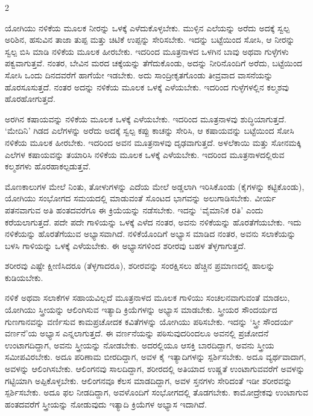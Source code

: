 \begin{multicols}{2}
\begin{kan}

ಯೋಗಿಯು ನಳಿಕೆಯ ಮೂಲಕ ನೀರನ್ನು ಒಳಕ್ಕೆ ಎಳೆದುಕೊಳ್ಳಬೇಕು. ಮುಳ್ಳಿನ ಎಲೆಯನ್ನು ಅರೆದು ಅದಕ್ಕೆ ಸ್ವಲ್ಪ ಅರಿಶಿನ, ಹಸುವಿನ ತಾಜಾ ತುಪ್ಪ ಮತ್ತು ಚಿಟಿಕೆ ಉಪ್ಪನ್ನು ಸೇರಿಸಬೇಕು. ಇದನ್ನು ಬಟ್ಟೆಯಿಂದ ಸೋಸಿ, ಆ ನೀರನ್ನು ಸ್ವಲ್ಪ ಬಿಸಿ ಮಾಡಿ ನಳಿಕೆಯ ಮೂಲಕ ಹೀರಬೇಕು. ಇದರಿಂದ ಮೂತ್ರನಾಳದ ಒಳಗಿನ ಬಾವು ಅಥವಾ ಗುಳ್ಳೆಗಳು ಪಕ್ವವಾಗುತ್ತವೆ. ನಂತರ, ಬೇವಿನ ಮರದ ಚಕ್ಕೆಯನ್ನು ತೆಗೆದುಕೊಂಡು, ಅದನ್ನು ನೀರಿನೊಂದಿಗೆ ಅರೆದು, ಬಟ್ಟೆಯಿಂದ ಸೋಸಿ ಒಂದು ದಿನದವರೆಗೆ ಹಾಗೆಯೇ ಇಡಬೇಕು. ಅದು ಸಾಂದ್ರೀಕೃತಗೊಂಡು ತೀವ್ರವಾದ ವಾಸನೆಯನ್ನು ಹೊರಸೂಸುತ್ತದೆ. ನಂತರ ಅದನ್ನು ನಳಿಕೆಯ ಮೂಲಕ ಒಳಕ್ಕೆ ಎಳೆಯಬೇಕು. ಇದರಿಂದ ಗುಳ್ಳೆಗಳಲ್ಲಿನ ಕಲ್ಮಶವು ಹೊರಹೋಗುತ್ತದೆ.

ಅರಗಿನ ಕಷಾಯವನ್ನು ನಳಿಕೆಯ ಮೂಲಕ ಒಳಕ್ಕೆ ಎಳೆಯಬೇಕು. ಇದರಿಂದ ಮೂತ್ರನಾಳವು ಶುದ್ಧಿಯಾಗುತ್ತದೆ. ‘ಮೇದಿನಿ’ ಗಿಡದ ಎಲೆಗಳನ್ನು ಅರೆದು ಅದಕ್ಕೆ ಸ್ವಲ್ಪ ಕಪ್ಪು ಕಾಚನ್ನು ಸೇರಿಸಿ, ಆ ಕಷಾಯವನ್ನು ಬಟ್ಟೆಯಿಂದ ಸೋಸಿ ನಳಿಕೆಯ ಮೂಲಕ ಹೀರಬೇಕು. ಇದರಿಂದ ಅವನ ಮೂತ್ರನಾಳವು ದೃಢವಾಗುತ್ತದೆ. ಅಳಲೆಕಾಯಿ ಮತ್ತು ಸೋನಮಕ್ಕಿ ಎಲೆಗಳ ಕಷಾಯವನ್ನು ತಯಾರಿಸಿ ನಳಿಕೆಯ ಮೂಲಕ ಒಳಕ್ಕೆ ಎಳೆಯಬೇಕು. ಇದರಿಂದ ಮೂತ್ರನಾಳದಲ್ಲಿರುವ ಕಲ್ಮಶಗಳು ಹೊರಹಾಕಲ್ಪಡುತ್ತವೆ.
\vskip 7pt


ಮೊಣಕಾಲುಗಳ ಮೇಲೆ ನಿಂತು, ತೋಳುಗಳನ್ನು ಎದೆಯ ಮೇಲೆ ಅಡ್ಡಲಾಗಿ ಇರಿಸಿಕೊಂಡು (ಕೈಗಳನ್ನು ಕಟ್ಟಿಕೊಂಡು), ಯೋಗಿಯು ಸಂಭೋಗದ ಸಮಯದಲ್ಲಿ ಮಾಡುವಂತೆ ಸೊಂಟದ ಭಾಗವನ್ನು ಅಲುಗಾಡಿಸಬೇಕು. ವೀರ್ಯ ಪತನವಾಗುವ ಅತಿ ಹಂತದವರೆಗೂ ಈ ಕ್ರಿಯೆಯನ್ನು ನಡೆಸಬೇಕು. ಇದನ್ನು ‘ವೈಮಾನಿಕ ರತಿ’ ಎಂದು ಕರೆಯಲಾಗುತ್ತದೆ. ಪದೇ ಪದೇ ಗಾಳಿಯನ್ನು ಒಳಕ್ಕೆ ಎಳೆದ ನಂತರ, ಅವನು ನಳಿಕೆಯನ್ನು ಹೊರತೆಗೆಯಬೇಕು. ಇದು ನಳಿಕೆಯನ್ನು ಹೊರತೆಗೆಯುವ ಅಭ್ಯಾಸವಾಗಿದೆ. ನಳಿಕೆಯೊಂದಿಗೆ ಅಭ್ಯಾಸ ಮಾಡಿದ ನಂತರ, ಅವನು ಸಲಾಕೆಯನ್ನು ಬಳಸಿ ಗಾಳಿಯನ್ನು ಒಳಕ್ಕೆ ಎಳೆಯಬೇಕು. ಈ ಅಭ್ಯಾಸಗಳಿಂದ ಶರೀರವು ಬಹಳ ತೆಳ್ಳಗಾಗುತ್ತದೆ.

ಶರೀರವು ಎಷ್ಟೇ ಕ್ಷೀಣಿಸಿದರೂ (ತೆಳ್ಳಗಾದರೂ), ಶರೀರವನ್ನು ಸಂರಕ್ಷಿಸಲು ಹೆಚ್ಚಿನ ಪ್ರಮಾಣದಲ್ಲಿ ಹಾಲನ್ನು ಕುಡಿಯಬೇಕು.
\vskip 7pt


ನಳಿಕೆ ಅಥವಾ ಸಲಾಕೆಗಳ ಸಹಾಯವಿಲ್ಲದೆ ಮೂತ್ರನಾಳದ ಮೂಲಕ ಗಾಳಿಯು ಸಂಚಲನವಾಗುವಂತೆ ಮಾಡಲು, ಯೋಗಿಯು ಸ್ತ್ರೀಯನ್ನು ಆಲಿಂಗಿಸುವ ಇತ್ಯಾದಿ ಕ್ರಿಯೆಗಳನ್ನು ಅಭ್ಯಾಸ ಮಾಡಬೇಕು. ಸ್ತ್ರೀಯರ ಸೌಂದರ್ಯದ ಗುಣಗಾನವನ್ನು ವರ್ಣಿಸುವ ಕಾಮಪ್ರಚೋದಕ ಕವಿತೆಗಳನ್ನು ಯೋಗಿಯು ಪಠಿಸಬೇಕು. ಇದನ್ನು ‘ಸ್ತ್ರೀ ಸೌಂದರ್ಯ ವರ್ಣನೆ’ಯ ಅಭ್ಯಾಸ ಎನ್ನಲಾಗುತ್ತದೆ. ಈ ವರ್ಣನೆಯನ್ನು ಪಠಿಸುವುದರಿಂದಲೂ ಅವನಲ್ಲಿ ಪ್ರಚೋದನೆ ಉಂಟಾಗದಿದ್ದಾಗ, ಅವನು ಸ್ತ್ರೀಯನ್ನು ನೋಡಬೇಕು. ಅದರಲ್ಲಿಯೂ ಆಸಕ್ತಿ ಬಾರದಿದ್ದಾಗ, ಅವನು ಸ್ತ್ರೀಯ ಸಮೀಪವಿರಬೇಕು. ಅದೂ ಪರಿಣಾಮ ಬೀರದಿದ್ದಾಗ, ಅವಳ ಕೈ ಇತ್ಯಾದಿಗಳನ್ನು ಸ್ಪರ್ಶಿಸಬೇಕು. ಅದೂ ವ್ಯರ್ಥವಾದಾಗ, ಅವಳನ್ನು ಆಲಿಂಗಿಸಬೇಕು. ಆಲಿಂಗನವು ಸಾಲದಿದ್ದಾಗ, ಶರೀರದಲ್ಲಿ ಅತಿಯಾದ ಉಷ್ಣತೆ ಉಂಟಾಗುವವರೆಗೆ ಅವಳನ್ನು ಗಟ್ಟಿಯಾಗಿ ಅಪ್ಪಿಕೊಳ್ಳಬೇಕು. ಆಲಿಂಗನವೂ ಕೆಲಸ ಮಾಡದಿದ್ದಾಗ, ಅವಳ ಸ್ತನಗಳು ಸೇರಿದಂತೆ ಇಡೀ ಶರೀರವನ್ನು ಸ್ಪರ್ಶಿಸಬೇಕು. ಅದೂ ಫಲ ನೀಡದಿದ್ದಾಗ, ಅವಳೊಂದಿಗೆ ಸಂಭೋಗದಲ್ಲಿ ತೊಡಗಬೇಕು. ಕಾಮೋದ್ರೇಕವು ಉಂಟಾಗುವ ಹಂತದವರೆಗೆ ಸ್ತ್ರೀಯನ್ನು ನೋಡುವುದು ಇತ್ಯಾದಿ ಕ್ರಿಯೆಗಳ ಅಭ್ಯಾಸ ಇದಾಗಿದೆ.


\end{kan}
\end{multicols}
